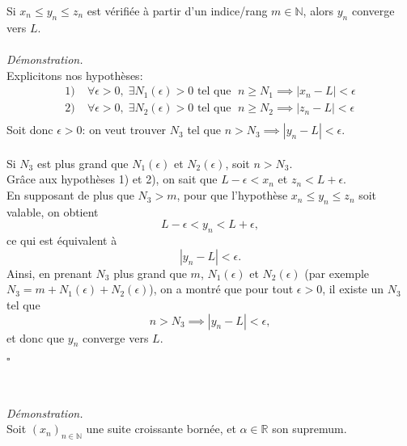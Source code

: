 \documentclass[oneside,11pt,french,table]{book}
\theoremstyle{definition}
\theoremstyle{plain}
\theoremstyle{remark}
\begin{document}
Si $x_n \leq y_n \leq z_n$ est vérifiée à partir d'un indice/rang $m \in \mathbb{N}$, alors $y_n$ converge vers $L$. \\ \\
\textit{Démonstration.} \\
Explicitons nos hypothèses:
\begin{align*}
    1)& \; \forall \epsilon > 0, \; \exists N_1(\epsilon) > 0 \text{ tel que } \; n \geq N_1 \implies \left| x_n - L \right| < \epsilon \\
    2)& \; \forall \epsilon > 0, \; \exists N_2(\epsilon) > 0 \text{ tel que } \; n \geq N_2 \implies \left| z_n - L \right| < \epsilon \\
\end{align*}
Soit donc $\epsilon > 0$: on veut trouver $N_3$ tel que $n > N_3 \implies \left| y_n - L \right| < \epsilon$. \\ \\
Si $N_3$ est plus grand que $N_1(\epsilon)$ et $N_2(\epsilon)$, soit $n > N_3$. \\
Grâce aux hypothèses 1) et 2), on sait que $L - \epsilon < x_n$ et $z_n < L + \epsilon$. \\
En supposant de plus que $N_3 > m$, pour que l'hypothèse $x_n \leq y_n \leq z_n$ soit valable, on obtient $$L-\epsilon < y_n < L + \epsilon,$$
ce qui est équivalent à $$ \left| y_n - L \right| < \epsilon.$$
Ainsi, en prenant $N_3$ plus grand que $m$, $N_1(\epsilon)$ et $N_2(\epsilon)$ (par exemple $N_3 = m + N_1(\epsilon)+ N_2(\epsilon)$), on a montré que pour tout $\epsilon > 0$, il existe un $N_3$ tel que $$n > N_3 \implies \left| y_n - L \right| < \epsilon,$$
et donc que $y_n$ converge vers $L$. \begin{flushright} $\square$
\end{flushright}
\vspace{1em}
 \\
\\
\textit{Démonstration.} \\
Soit $(x_n)_{n \in \mathbb{N}}$ une suite croissante bornée, et $\alpha \in \mathbb{R}$ son supremum. \\
\end{document}
